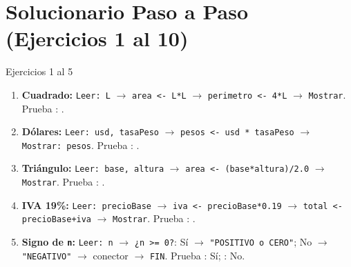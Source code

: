 \documentclass[11pt,letterpaper]{article}
\begin{document}
\section{Solucionario Paso a Paso (Ejercicios 1 al 10)}

\begin{solucion}{Ejercicios 1 al 5}
\begin{enumerate}
  \item \textbf{Cuadrado:} \texttt{Leer: L} $\rightarrow$ \texttt{area <- L*L} $\rightarrow$ \texttt{perimetro <- 4*L} $\rightarrow$ \texttt{Mostrar}. Prueba : .
  \item \textbf{Dólares:} \texttt{Leer: usd, tasaPeso} $\rightarrow$ \texttt{pesos <- usd * tasaPeso} $\rightarrow$ \texttt{Mostrar: pesos}. Prueba : .
  \item \textbf{Triángulo:} \texttt{Leer: base, altura} $\rightarrow$ \texttt{area <- (base*altura)/2.0} $\rightarrow$ \texttt{Mostrar}. Prueba : .
  \item \textbf{IVA 19\%:} \texttt{Leer: precioBase} $\rightarrow$ \texttt{iva <- precioBase*0.19} $\rightarrow$ \texttt{total <- precioBase+iva} $\rightarrow$ \texttt{Mostrar}. Prueba : .
  \item \textbf{Signo de \texttt{n}:} \texttt{Leer: n} $\rightarrow$ \texttt{¿n >= 0?}: Sí $\rightarrow$ \texttt{"POSITIVO o CERO"}; No $\rightarrow$ \texttt{"NEGATIVO"} $\rightarrow$ conector $\rightarrow$ \texttt{FIN}. Prueba : Sí; : No.
\end{enumerate}
\end{solucion}
\end{document}
